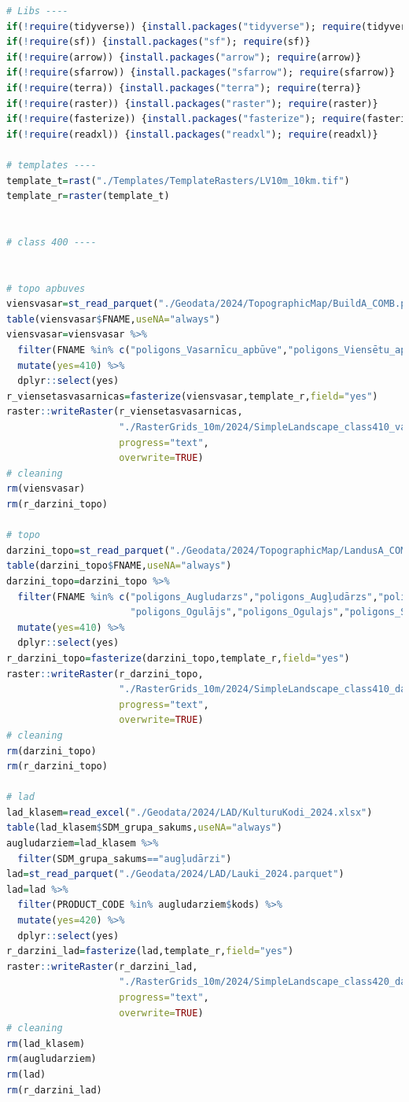 \documentclass[
]{book}
\begin{document}
\begin{lstlisting}[language=R]
# Libs ----
if(!require(tidyverse)) {install.packages("tidyverse"); require(tidyverse)}
if(!require(sf)) {install.packages("sf"); require(sf)}
if(!require(arrow)) {install.packages("arrow"); require(arrow)}
if(!require(sfarrow)) {install.packages("sfarrow"); require(sfarrow)}
if(!require(terra)) {install.packages("terra"); require(terra)}
if(!require(raster)) {install.packages("raster"); require(raster)}
if(!require(fasterize)) {install.packages("fasterize"); require(fasterize)}
if(!require(readxl)) {install.packages("readxl"); require(readxl)}

# templates ----
template_t=rast("./Templates/TemplateRasters/LV10m_10km.tif")
template_r=raster(template_t)


# class 400 ----


# topo apbuves
viensvasar=st_read_parquet("./Geodata/2024/TopographicMap/BuildA_COMB.parquet")
table(viensvasar$FNAME,useNA="always")
viensvasar=viensvasar %>% 
  filter(FNAME %in% c("poligons_Vasarnīcu_apbūve","poligons_Viensētu_apbūve")) %>% 
  mutate(yes=410) %>% 
  dplyr::select(yes)
r_viensetasvasarnicas=fasterize(viensvasar,template_r,field="yes")
raster::writeRaster(r_viensetasvasarnicas,
                    "./RasterGrids_10m/2024/SimpleLandscape_class410_vasarnicasviensetas_topo.tif",
                    progress="text",
                    overwrite=TRUE)
# cleaning
rm(viensvasar)
rm(r_darzini_topo)

# topo
darzini_topo=st_read_parquet("./Geodata/2024/TopographicMap/LandusA_COMB.parquet")
table(darzini_topo$FNAME,useNA="always")
darzini_topo=darzini_topo %>% 
  filter(FNAME %in% c("poligons_Augludarzs","poligons_Augļudārzs","poligons_Sakņudārzs",
                      "poligons_Ogulājs","poligons_Ogulajs","poligons_Saknudarzs")) %>% 
  mutate(yes=410) %>% 
  dplyr::select(yes)
r_darzini_topo=fasterize(darzini_topo,template_r,field="yes")
raster::writeRaster(r_darzini_topo,
                    "./RasterGrids_10m/2024/SimpleLandscape_class410_darzini_topo.tif",
                    progress="text",
                    overwrite=TRUE)
# cleaning
rm(darzini_topo)
rm(r_darzini_topo)

# lad
lad_klasem=read_excel("./Geodata/2024/LAD/KulturuKodi_2024.xlsx")
table(lad_klasem$SDM_grupa_sakums,useNA="always")
augludarziem=lad_klasem %>% 
  filter(SDM_grupa_sakums=="augļudārzi")
lad=st_read_parquet("./Geodata/2024/LAD/Lauki_2024.parquet")
lad=lad %>% 
  filter(PRODUCT_CODE %in% augludarziem$kods) %>% 
  mutate(yes=420) %>% 
  dplyr::select(yes)
r_darzini_lad=fasterize(lad,template_r,field="yes")
raster::writeRaster(r_darzini_lad,
                    "./RasterGrids_10m/2024/SimpleLandscape_class420_darzini_lad.tif",
                    progress="text",
                    overwrite=TRUE)
# cleaning
rm(lad_klasem)
rm(augludarziem)
rm(lad)
rm(r_darzini_lad)


\end{lstlisting}
\end{document}
